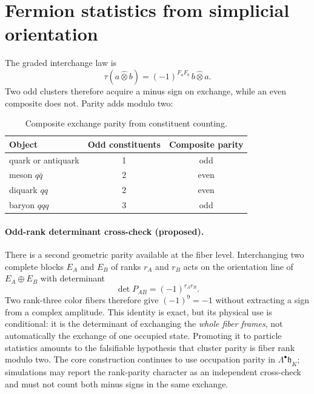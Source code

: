 \documentclass[11pt,letterpaper]{article}
\newcommand{\hh}{\mathfrak{h}}
\newcommand{\gtens}{\mathbin{\widehat{\otimes}}}
\begin{document}
\section{Fermion statistics from simplicial orientation}\label{sec:statistics}

The graded interchange law is
\begin{equation*}
  \tau(a\gtens b)=(-1)^{F_{a}F_{b}}\,b\gtens a.
\end{equation*}
Two odd clusters therefore acquire a minus sign on exchange, while an even
composite does not. Parity adds modulo two:

\begin{table}[htb]
\centering
\begin{tabular}{lcc}
\toprule
Object & Odd constituents & Composite parity\\
\midrule
quark or antiquark & 1 & odd\\
meson $q\bar{q}$ & 2 & even\\
diquark $qq$ & 2 & even\\
baryon $qqq$ & 3 & odd\\
\bottomrule
\end{tabular}
\caption{Composite exchange parity from constituent counting.}
\label{tab:parity}
\end{table}

\paragraph{Odd-rank determinant cross-check (proposed).}
There is a second geometric parity available at the fiber level. Interchanging
two complete blocks $E_A$ and $E_B$ of ranks $r_A$ and $r_B$ acts on the
orientation line of $E_A\oplus E_B$ with determinant
\begin{equation*}
  \det P_{AB}=(-1)^{r_Ar_B}.
\end{equation*}
Two rank-three color fibers therefore give $(-1)^9=-1$ without extracting a
sign from a complex amplitude. This identity is exact, but its physical use is
conditional: it is the determinant of exchanging the \emph{whole fiber
frames}, not automatically the exchange of one occupied state. Promoting it
to particle statistics amounts to the falsifiable hypothesis that cluster
parity is fiber rank modulo two. The core construction continues to use
occupation parity in $\Lambda^\bullet\hh_K$; simulations may report the
rank-parity character as an independent cross-check and must not count both
minus signs in the same exchange.
\end{document}
